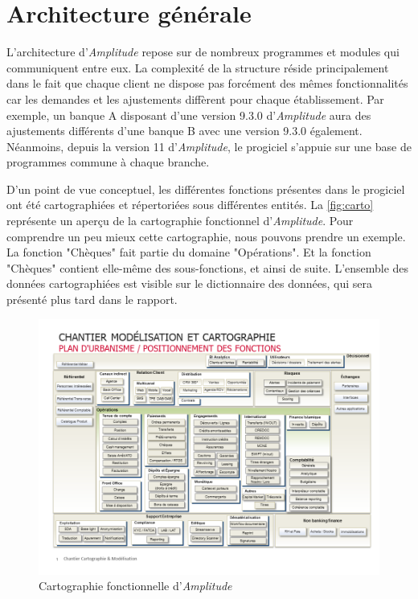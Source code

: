 \documentclass{polytech/polytech}
\begin{document}
\section{Architecture générale}
\label{sec:architectureAmplitude}

L'architecture d'\textit{Amplitude} repose sur de nombreux programmes et modules qui communiquent entre eux. La complexité de la structure réside principalement dans le fait que chaque client ne dispose pas forcément des mêmes fonctionnalités car les demandes et les ajustements diffèrent pour chaque établissement. Par exemple, un banque A disposant d'une version 9.3.0 d'\textit{Amplitude} aura des ajustements différents d'une banque B avec une version 9.3.0 également. Néanmoins, depuis la version 11 d'\textit{Amplitude}, le progiciel s'appuie sur une base de programmes commune à chaque branche. 

D'un point de vue conceptuel, les différentes fonctions présentes dans le progiciel ont été cartographiées et répertoriées sous différentes entités. La \autoref{fig:carto} représente un aperçu de la cartographie fonctionnel d'\textit{Amplitude}. Pour comprendre un peu mieux cette cartographie, nous pouvons prendre un exemple. La fonction "Chèques" fait partie du domaine "Opérations". Et la fonction "Chèques" contient elle-même des sous-fonctions, et ainsi de suite. L'ensemble des données cartographiées est visible sur le dictionnaire des données, qui sera présenté plus tard dans le rapport. 

\begin{figure}
	\includegraphics[scale=0.62]{images/Cartographie_fonctionnelle}
	\caption{Cartographie fonctionnelle d'\textit{Amplitude}}
	\label{fig:carto}
\end{figure}
\end{document}
